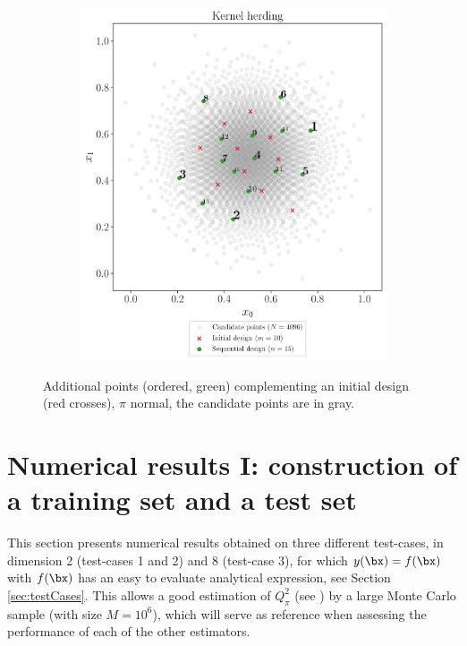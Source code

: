 \begin{figure}
\begin{subfigure}[b]{0.48\linewidth}
  \end{subfigure}
  \\
  \begin{subfigure}[b]{0.48\linewidth}
    \centering
    \includegraphics[width=\textwidth]{./part2/figures/SIS/normal2D_KH.pdf}
  \end{subfigure}
  \caption{Additional points (ordered, green) complementing an initial design (red crosses), $\pi$ normal, the candidate points are in gray.}
  \label{fig:normal_validation_designs}
\end{figure}   





\section{Numerical results I: construction of a training set and a test set}\label{sec:val_res1}
This section presents numerical results obtained on three different test-cases, in dimension 2 (test-cases 1 and 2) and 8 (test-case 3), for which $y(\bx)=f(\bx)$ with $f(\bx)$ has an easy to evaluate analytical expression, see Section \ref{sec:testCases}. 
This allows a good estimation of $Q_\pi^2$ (see ) by a large Monte Carlo sample (with size $M=10^6$), which will serve as reference when assessing the performance of each of the other estimators. 

